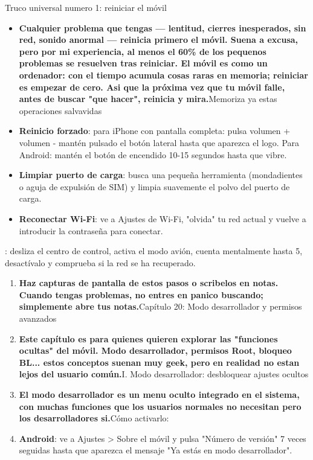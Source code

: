Truco universal numero 1: reiniciar el móvil

\begin{itemize}
  \item \textbf{Cualquier problema que tengas — lentitud, cierres inesperados, sin red, sonido anormal — reinicia primero el móvil. Suena a excusa, pero por mi experiencia, al menos el 60\% de los pequenos problemas se resuelven tras reiniciar. El móvil es como un ordenador: con el tiempo acumula cosas raras en memoria; reiniciar es empezar de cero. Asi que la próxima vez que tu móvil falle, antes de buscar "que hacer", reinicia y mira.}Memoriza ya estas operaciones salvavidas
  \item \textbf{Reinicio forzado}: para iPhone con pantalla completa: pulsa volumen + volumen - mantén pulsado el botón lateral hasta que aparezca el logo. Para Android: mantén el botón de encendido 10-15 segundos hasta que vibre.
  \item \textbf{Limpiar puerto de carga}: busca una pequeña herramienta (mondadientes o aguja de expulsión de SIM) y limpia suavemente el polvo del puerto de carga.
  \item \textbf{Reconectar Wi-Fi}: ve a Ajustes de Wi-Fi, "olvida" tu red actual y vuelve a introducir la contraseña para conectar.
\end{itemize}


: desliza el centro de control, activa el modo avión, cuenta mentalmente hasta 5, desactívalo y comprueba si la red se ha recuperado.

\begin{enumerate}
  \item \textbf{Haz capturas de pantalla de estos pasos o scribelos en notas. Cuando tengas problemas, no entres en panico buscando; simplemente abre tus notas.}Capítulo 20: Modo desarrollador y permisos avanzados
  \item \textbf{Este capítulo es para quienes quieren explorar las "funciones ocultas" del móvil. Modo desarrollador, permisos Root, bloqueo BL... estos conceptos suenan muy geek, pero en realidad no estan lejos del usuario común.}I. Modo desarrollador: desbloquear ajustes ocultos
  \item \textbf{El modo desarrollador es un menu oculto integrado en el sistema, con muchas funciones que los usuarios normales no necesitan pero los desarrolladores si.}Cómo activarlo:
  \item \textbf{Android}: ve a Ajustes > Sobre el móvil y pulsa "Número de versión" 7 veces seguidas hasta que aparezca el mensaje "Ya estás en modo desarrollador".
\end{enumerate}

